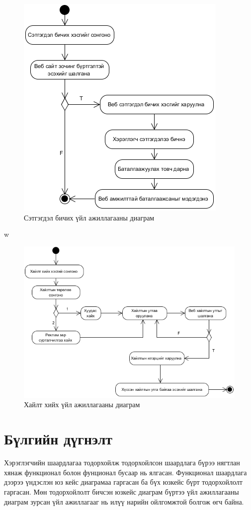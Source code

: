 \begin{figure}
	\centering
	\includegraphics[scale=0.75]{Diagrams/comment}
	\caption[Сэтгэгдэл бичих үйл ажиллагааны диаграм]{Сэтгэгдэл бичих үйл ажиллагааны диаграм}
	\label{text}
\end{figure}w

\begin{figure}
	\centering
	\includegraphics[scale=0.7]{Diagrams/search}
	\caption[Хайлт хийх үйл ажиллагааны диаграм]{Хайлт хийх үйл ажиллагааны диаграм}
	\label{text}
\end{figure}


\section{Бүлгийн дүгнэлт}
Хэрэглэгчийн шаардлагаа тодорхойлж тодорхойлсон шаардлага бүрээ нягтлан хянаж функционал болон фунционал бусаар нь ялгасан. Функционал шаардлага дээрээ үндэслэн юз кейс диаграмаа гаргасан ба бүх  юзкейс бүрт тодорхойлолт гаргасан. Мөн тодорхойлолт бичсэн юзкейс диаграм бүртээ үйл ажиллагааны диаграм зурсан үйл ажиллагааг нь илүү нарийн ойлгомжтой болгож өгч байна.

